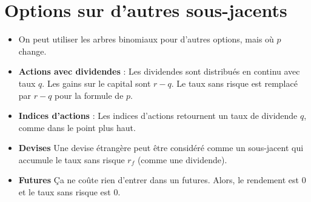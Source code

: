 \section{Options sur d'autres sous-jacents}

\begin{itemize}
	\item On peut utiliser les arbres binomiaux pour d'autres options, mais où $p$ change. 
	\item \textbf{Actions avec dividendes} : Les dividendes sont distribués en continu avec taux $q$. Les gains sur le capital sont $r-q$. Le taux sans risque est remplacé par $r-q$ pour la formule de $p$.
	\item \textbf{Indices d'actions} : Les indices d'actions retournent un taux de dividende $q$, comme dans le point plus haut. 
	\item \textbf{Devises} Une devise étrangère peut être considéré comme un sous-jacent qui accumule le taux sans risque $r_f$ (comme une dividende). 
	\item \textbf{Futures} Ça ne coûte rien d'entrer dans un futures. Alors, le rendement est 0 et le taux sans risque est $0$. 
\end{itemize}
































































